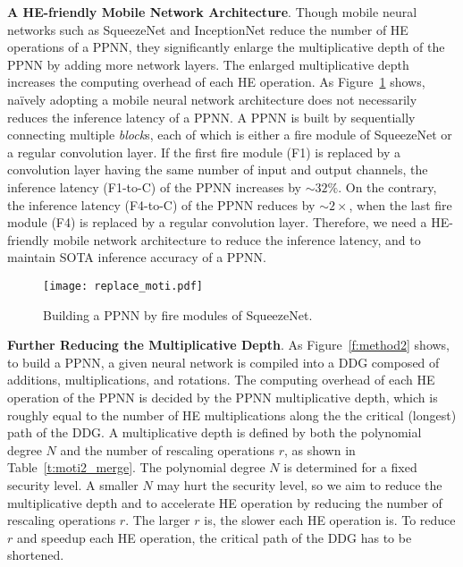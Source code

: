 \documentclass{article}
\begin{document}
\textbf{A HE-friendly Mobile Network Architecture}. Though mobile neural networks such as SqueezeNet and InceptionNet reduce the number of HE operations of a PPNN, they significantly enlarge the multiplicative depth of the PPNN by adding more network layers. The enlarged multiplicative depth increases the computing overhead of each HE operation. As Figure~\ref{f:moti_replacemnt} shows, na\"ively adopting a mobile neural network architecture does not necessarily reduces the inference latency of a PPNN. A PPNN is built by sequentially connecting multiple \textit{block}s, each of which is either a fire module of SqueezeNet or a regular convolution layer. If the first fire module (F1) is replaced by a convolution layer having the same number of input and output channels, the inference latency (F1-to-C) of the PPNN increases by $\sim 32\%$. On the contrary, the inference latency (F4-to-C) of the PPNN reduces by $\sim 2 \times$, when the last fire module (F4) is replaced by a regular convolution layer. Therefore, we need a HE-friendly mobile network architecture to reduce the inference latency, and to maintain SOTA inference accuracy of a PPNN.
	
	

\begin{figure}[t!]
\centering
\texttt{[image: replace\_moti.pdf]}
\vspace{-0.1in}
\caption{Building a PPNN by fire modules of SqueezeNet.}
\label{f:moti_replacemnt}
\vspace{-0.2in}
\end{figure}
	



\textbf{Further Reducing the Multiplicative Depth}. As Figure~\ref{f:method2} shows, to build a PPNN, a given neural network is compiled into a DDG composed of additions, multiplications, and rotations. The computing overhead of each HE operation of the PPNN is decided by the PPNN multiplicative depth, which is roughly equal to the number of HE multiplications along the the critical (longest) path of the DDG. A multiplicative depth is defined by both the polynomial degree $N$ and the number of rescaling operations $r$, as shown in Table~\ref{t:moti2_merge}. The polynomial degree $N$ is determined for a fixed security level. A smaller $N$ may hurt the security level, so we aim to reduce the multiplicative depth and to accelerate HE operation by reducing the number of rescaling operations $r$. The larger $r$ is, the slower each HE operation is. To reduce $r$ and speedup each HE operation, the critical path of the DDG has to be shortened.
	
\end{document}
